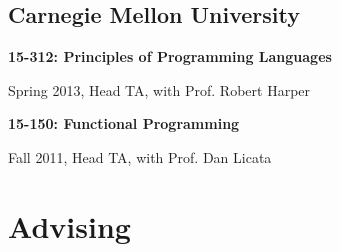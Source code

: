 \documentclass[10pt,letterpaper]{article}
\renewenvironment{itemize}{
  \begin{list}{}{
    \setlength{\leftmargin}{1.25em}
    \setlength{\itemsep}{0.25em}
    \setlength{\parskip}{0pt}
    \setlength{\parsep}{0.2em}
  }
}{
  \end{list}
}
\begin{document}
\subsection*{Carnegie Mellon University}
\begin{itemize}
  \item \textbf{15-312: Principles of Programming Languages} 
        \begin{itemize}
          \item Spring 2013, Head TA, with Prof. Robert Harper
        \end{itemize}
  \item \textbf{15-150: Functional Programming}
      \begin{itemize}
        \item Fall 2011, Head TA, with Prof. Dan Licata
      \end{itemize}
\end{itemize}


\section*{Advising}
\end{document}
